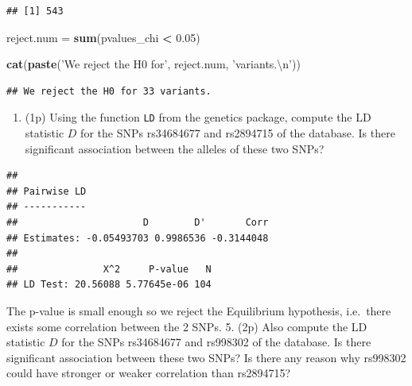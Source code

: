 \documentclass[
]{article}
\newenvironment{Shaded}{\begin{snugshade}}{\end{snugshade}}
\newcommand{\CharTok}[1]{\textcolor[rgb]{0.31,0.60,0.02}{#1}}
\newcommand{\DataTypeTok}[1]{\textcolor[rgb]{0.13,0.29,0.53}{#1}}
\newcommand{\FloatTok}[1]{\textcolor[rgb]{0.00,0.00,0.81}{#1}}
\newcommand{\KeywordTok}[1]{\textcolor[rgb]{0.13,0.29,0.53}{\textbf{#1}}}
\newcommand{\NormalTok}[1]{#1}
\newcommand{\OperatorTok}[1]{\textcolor[rgb]{0.81,0.36,0.00}{\textbf{#1}}}
\newcommand{\StringTok}[1]{\textcolor[rgb]{0.31,0.60,0.02}{#1}}
\providecommand{\tightlist}{%
  \setlength{\itemsep}{0pt}\setlength{\parskip}{0pt}}
\begin{document}
\begin{verbatim}
## [1] 543
\end{verbatim}

\begin{Shaded}
\begin{Highlighting}[]
\NormalTok{reject.num =}\StringTok{ }\KeywordTok{sum}\NormalTok{(pvalues_chi }\OperatorTok{<}\StringTok{ }\FloatTok{0.05}\NormalTok{)}

\KeywordTok{cat}\NormalTok{(}\KeywordTok{paste}\NormalTok{(}\StringTok{'We reject the H0 for'}\NormalTok{, reject.num, }\StringTok{'variants.}\CharTok{\textbackslash{}n}\StringTok{'}\NormalTok{))}
\end{Highlighting}
\end{Shaded}

\begin{verbatim}
## We reject the H0 for 33 variants.
\end{verbatim}

\begin{enumerate}
\def\labelenumi{\arabic{enumi}.}
\setcounter{enumi}{3}
\tightlist
\item
  (1p) Using the function \texttt{LD} from the genetics package, compute
  the LD statistic \(D\) for the SNPs rs34684677 and rs2894715 of the
  database. Is there significant association between the alleles of
  these two SNPs?
\end{enumerate}

\begin{Shaded}
\end{Shaded}

\begin{verbatim}
## 
## Pairwise LD
## -----------
##                      D        D'       Corr
## Estimates: -0.05493703 0.9986536 -0.3144048
## 
##               X^2     P-value   N
## LD Test: 20.56088 5.77645e-06 104
\end{verbatim}

The p-value is small enough so we reject the Equilibrium hypothesis,
i.e.~there exists some correlation between the 2 SNPs. 5. (2p) Also
compute the LD statistic \(D\) for the SNPs rs34684677 and rs998302 of
the database. Is there significant association between these two SNPs?
Is there any reason why rs998302 could have stronger or weaker
correlation than rs2894715?
\end{document}
